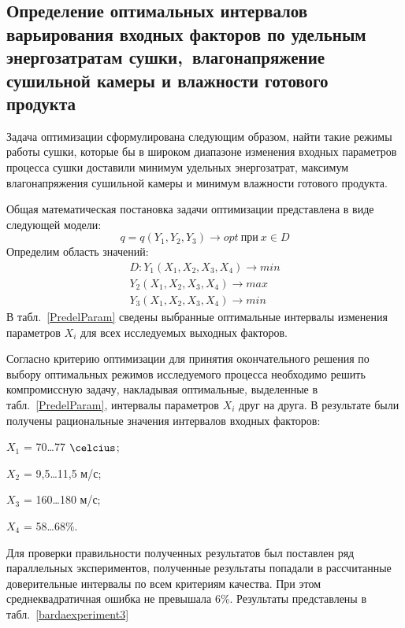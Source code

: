 \subsection{Определение оптимальных интервалов варьирования входных факторов по удельным
энергозатратам сушки,\ влагонапряжение сушильной камеры и  влажности
готового продукта}

Задача оптимизации сформулирована следующим образом, найти такие режимы работы сушки,
которые бы в широком диапазоне изменения входных параметров процесса сушки доставили минимум
удельных энергозатрат, максимум влагонапряжения сушильной камеры и минимум влажности готового продукта.

Общая математическая постановка задачи оптимизации представлена в виде следующей модели:
\begin{equation}
q = q(Y_1, Y_2, Y_3) \to opt~\textrm{при}~x\in D
\end{equation}
Определим область значений:
\begin{eqnarray}
D: Y_1 (X_1, X_2, X_3, X_4)\to min \nonumber\\
Y_2 (X_1, X_2, X_3, X_4)\to max \\
Y_3 (X_1, X_2, X_3, X_4)\to min  \nonumber
\end{eqnarray}
В табл.~\ref{PredelParam} сведены выбранные оптимальные интервалы изменения параметров $X_i$
для всех исследуемых выходных факторов.



Согласно критерию оптимизации  для принятия окончательного решения по выбору оптимальных
режимов исследуемого процесса необходимо решить компромиссную задачу, накладывая
оптимальные, выделенные в табл.~\ref{PredelParam}, интервалы параметров $X_i$ друг на друга.
\clearpage
В результате были получены рациональные значения интервалов входных факторов:
\begin{description}
\item 
$X_1$ = 70\dots77 $\celcius$;
\item 
$X_2$ = 9,5\dots11,5 м/с;
\item 
$X_3$ = 160\dots180 м/с;
\item 
$X_4$ = 58\dots68\%.
\end{description}

Для проверки правильности полученных результатов был поставлен ряд
параллельных экспериментов, полученные результаты попадали в рассчитанные доверительные интервалы по всем критериям качества. При этом среднеквадратичная ошибка не превышала 6\%.
Результаты представлены в табл.~\ref{bardaexperiment3}
